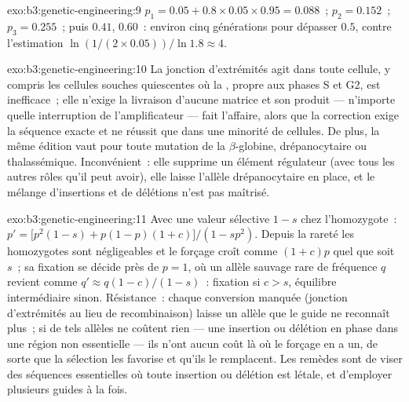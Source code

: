 \begin{solution}{exo:b3:genetic-engineering:9}
$p_{1} = 0.05 + 0.8\times 0.05\times 0.95 = 0.088$~; $p_{2} = 0.152$~;
$p_{3} = 0.255$~; puis $0.41$, $0.60$~: environ cinq générations pour
dépasser $0.5$, contre l'estimation
$\ln(1/(2\times 0.05))/\ln 1.8 \approx 4$.
\end{solution}

\begin{solution}{exo:b3:genetic-engineering:10}
La jonction d'extrémités agit dans toute cellule, y compris les
cellules souches quiescentes où la , propre aux
phases S et G2, est inefficace~; elle n'exige la livraison d'aucune
matrice et son produit --- n'importe quelle interruption de
l'amplificateur --- fait l'affaire, alors que la correction exige la
séquence exacte et ne réussit que dans une minorité de cellules. De
plus, la même édition vaut pour toute mutation de la $\beta$-globine,
drépanocytaire ou thalassémique. Inconvénient~: elle supprime un
élément régulateur (avec tous les autres rôles qu'il peut avoir), elle
laisse l'allèle drépanocytaire en place, et le mélange d'insertions et
de délétions n'est pas maîtrisé.
\end{solution}

\begin{solution}{exo:b3:genetic-engineering:11}
Avec une valeur sélective $1 - s$ chez l'homozygote~: $p' = \bigl[p^{2}(1-s) + p(1-p)(1+c)
\bigr]/(1 - sp^{2})$. Depuis la rareté les homozygotes sont
négligeables et le forçage croît comme $(1+c)p$ quel que soit $s$~; sa
fixation se décide près de $p = 1$, où un allèle sauvage rare de
fréquence $q$ revient comme $q' \approx q(1-c)/(1-s)$~: fixation si
$c > s$, équilibre intermédiaire sinon. Résistance~: chaque conversion
manquée (jonction d'extrémités au lieu de recombinaison) laisse un
allèle que le guide ne reconnaît plus~; si de tels allèles ne coûtent
rien --- une insertion ou délétion en phase dans une région non
essentielle --- ils n'ont aucun coût là où le forçage en a un, de sorte
que la sélection les favorise et qu'ils le remplacent. Les remèdes sont
de viser des séquences essentielles où toute insertion ou délétion est
létale, et d'employer plusieurs guides à la fois.
\end{solution}

